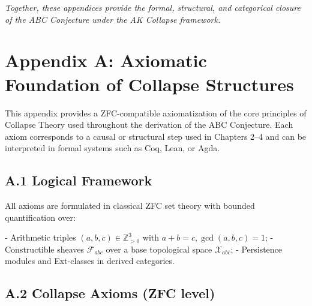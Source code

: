 \documentclass[11pt]{article}
\begin{document}
\bigskip

\begin{center}
\textit{Together, these appendices provide the formal, structural, and categorical closure  
of the ABC Conjecture under the AK Collapse framework.}
\end{center}



\appendix
\section*{Appendix A: Axiomatic Foundation of Collapse Structures}

This appendix provides a ZFC-compatible axiomatization of the core principles of Collapse Theory  
used throughout the derivation of the ABC Conjecture. Each axiom corresponds to a causal or structural step  
used in Chapters 2–4 and can be interpreted in formal systems such as Coq, Lean, or Agda.

\subsection*{A.1 Logical Framework}

All axioms are formulated in classical ZFC set theory with bounded quantification over:

- Arithmetic triples \( (a,b,c) \in \mathbb{Z}_{>0}^3 \) with \( a + b = c, \gcd(a,b,c)=1 \);
- Constructible sheaves \( \mathcal{F}_{abc} \) over a base topological space \( \mathcal{X}_{abc} \);
- Persistence modules and Ext-classes in derived categories.

\subsection*{A.2 Collapse Axioms (ZFC level)}
\end{document}
